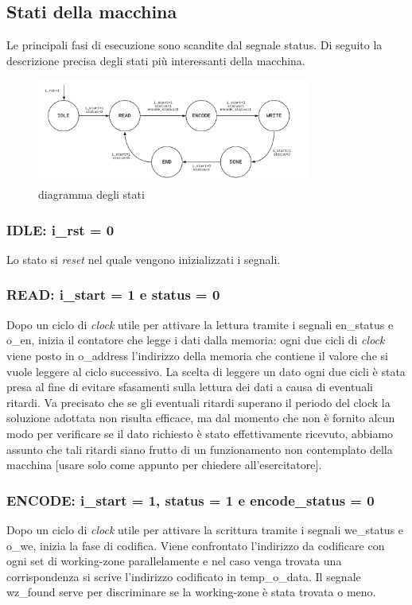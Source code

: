 \documentclass{article}
\begin{document}
\subsection{Stati della macchina}
Le principali fasi di esecuzione sono scandite dal segnale {\selectfont status}. Di seguito la descrizione precisa degli stati più interessanti della macchina.
\begin{figure}[h]
    \centering
    \includegraphics[width=0.8\textwidth]{fsa}
    \caption{diagramma degli stati}
\end{figure}
\subsubsection{IDLE: {\selectfont i\_rst} = 0}
Lo stato si \textit{reset} nel quale vengono inizializzati i segnali.
\subsubsection{READ: {\selectfont i\_start} = 1 e {\selectfont status} = 0}
Dopo un ciclo di \textit{clock} utile per attivare la lettura tramite i segnali {\selectfont en\_status} e {\selectfont o\_en}, inizia il contatore che legge i dati dalla memoria: ogni due cicli di \textit{clock} viene posto in {\selectfont o\_address} l'indirizzo della memoria che contiene il valore che si vuole leggere al ciclo successivo. La scelta di leggere un dato ogni due cicli è stata presa al fine di evitare sfasamenti sulla lettura dei dati a causa di eventuali ritardi. Va precisato che se gli eventuali ritardi superano il periodo del clock la soluzione adottata non risulta efficace, ma dal momento che non è fornito alcun modo per verificare se il dato richiesto è stato effettivamente ricevuto, abbiamo assunto che tali ritardi siano frutto di un funzionamento non contemplato della macchina [usare solo come appunto per chiedere all'esercitatore].
\subsubsection{ENCODE: {\selectfont i\_start} = 1, {\selectfont status} = 1 e {\selectfont encode\_status} = 0}
Dopo un ciclo di \textit{clock} utile per attivare la scrittura tramite i segnali {\selectfont we\_status} e {\selectfont o\_we}, inizia la fase di codifica. Viene confrontato l'indirizzo da codificare con ogni set di working-zone parallelamente e nel caso venga trovata una corrispondenza si scrive l'indirizzo codificato in {\selectfont temp\_o\_data}. Il segnale {\selectfont wz\_found} serve per discriminare se la working-zone è stata trovata o meno.
\end{document}
